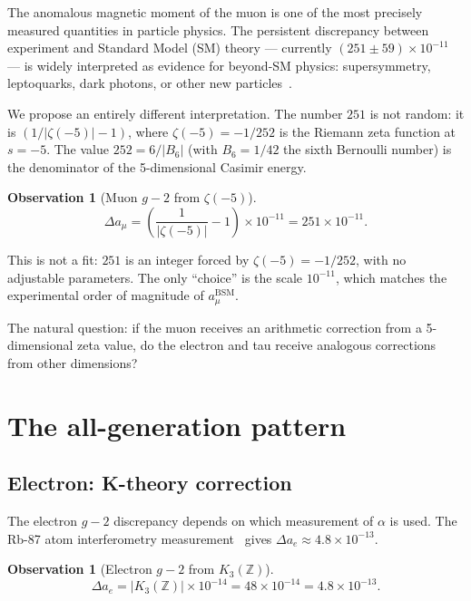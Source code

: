 \documentclass[11pt,a4paper]{article}
\newtheorem{observation}[theorem]{Observation}
\begin{document}
The anomalous magnetic moment of the muon is one of the most
precisely measured quantities in particle physics. The persistent
discrepancy between experiment and Standard Model (SM) theory
--- currently $(251 \pm 59) \times 10^{-11}$~\cite{Muong2_2021}
--- is widely interpreted as evidence for beyond-SM physics:
supersymmetry, leptoquarks, dark photons, or other new
particles~\cite{Athron2021}.

We propose an entirely different interpretation. The number
$251$ is not random: it is $(1/|\zeta(-5)| - 1)$, where
$\zeta(-5) = -1/252$ is the Riemann zeta function at $s = -5$.
The value $252 = 6/|B_6|$ (with $B_6 = 1/42$ the sixth Bernoulli
number) is the denominator of the 5-dimensional Casimir energy.

\begin{observation}[Muon $g-2$ from $\zeta(-5)$]
\label{obs:muon}
\begin{equation}
  \Delta a_\mu = \left(\frac{1}{|\zeta(-5)|} - 1\right)
  \times 10^{-11} = 251 \times 10^{-11}.
  \label{eq:muon}
\end{equation}
\end{observation}

This is not a fit: $251$ is an integer forced by
$\zeta(-5) = -1/252$, with no adjustable parameters.
The only ``choice'' is the scale $10^{-11}$, which matches
the experimental order of magnitude of $a_\mu^{\mathrm{BSM}}$.

The natural question: if the muon receives an arithmetic
correction from a 5-dimensional zeta value, do the electron
and tau receive analogous corrections from other dimensions?

\section{The all-generation pattern}
\label{sec:pattern}

\subsection{Electron: K-theory correction}

The electron $g-2$ discrepancy depends on which measurement
of $\alpha$ is used. The Rb-87 atom interferometry
measurement~\cite{Morel2020} gives
$\Delta a_e \approx 4.8 \times 10^{-13}$.

\begin{observation}[Electron $g-2$ from $K_3(\mathbb{Z})$]
\label{obs:electron}
\begin{equation}
  \Delta a_e = |K_3(\mathbb{Z})| \times 10^{-14} = 48 \times 10^{-14}
  = 4.8 \times 10^{-13}.
  \label{eq:electron}
\end{equation}
\end{observation}
\end{document}
